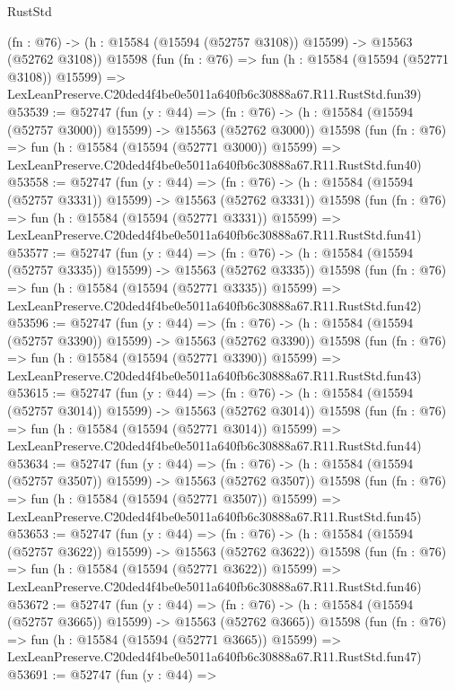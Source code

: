 \begin{lexlean}{RustStd}
\begin{coremodule}
    (fn : @76) -> (h : @15584 (@15594 (@52757 @3108)) @15599) -> @15563 (@52762 @3108))
    @15598
    (fun (fn : @76) =>
    fun (h : @15584 (@15594 (@52771 @3108)) @15599) =>
    LexLeanPreserve.C20ded4f4be0e5011a640fb6c30888a67.R11.RustStd.fun39)
@53539 := @52747
    (fun (y : @44) =>
    (fn : @76) -> (h : @15584 (@15594 (@52757 @3000)) @15599) -> @15563 (@52762 @3000))
    @15598
    (fun (fn : @76) =>
    fun (h : @15584 (@15594 (@52771 @3000)) @15599) =>
    LexLeanPreserve.C20ded4f4be0e5011a640fb6c30888a67.R11.RustStd.fun40)
@53558 := @52747
    (fun (y : @44) =>
    (fn : @76) -> (h : @15584 (@15594 (@52757 @3331)) @15599) -> @15563 (@52762 @3331))
    @15598
    (fun (fn : @76) =>
    fun (h : @15584 (@15594 (@52771 @3331)) @15599) =>
    LexLeanPreserve.C20ded4f4be0e5011a640fb6c30888a67.R11.RustStd.fun41)
@53577 := @52747
    (fun (y : @44) =>
    (fn : @76) -> (h : @15584 (@15594 (@52757 @3335)) @15599) -> @15563 (@52762 @3335))
    @15598
    (fun (fn : @76) =>
    fun (h : @15584 (@15594 (@52771 @3335)) @15599) =>
    LexLeanPreserve.C20ded4f4be0e5011a640fb6c30888a67.R11.RustStd.fun42)
@53596 := @52747
    (fun (y : @44) =>
    (fn : @76) -> (h : @15584 (@15594 (@52757 @3390)) @15599) -> @15563 (@52762 @3390))
    @15598
    (fun (fn : @76) =>
    fun (h : @15584 (@15594 (@52771 @3390)) @15599) =>
    LexLeanPreserve.C20ded4f4be0e5011a640fb6c30888a67.R11.RustStd.fun43)
@53615 := @52747
    (fun (y : @44) =>
    (fn : @76) -> (h : @15584 (@15594 (@52757 @3014)) @15599) -> @15563 (@52762 @3014))
    @15598
    (fun (fn : @76) =>
    fun (h : @15584 (@15594 (@52771 @3014)) @15599) =>
    LexLeanPreserve.C20ded4f4be0e5011a640fb6c30888a67.R11.RustStd.fun44)
@53634 := @52747
    (fun (y : @44) =>
    (fn : @76) -> (h : @15584 (@15594 (@52757 @3507)) @15599) -> @15563 (@52762 @3507))
    @15598
    (fun (fn : @76) =>
    fun (h : @15584 (@15594 (@52771 @3507)) @15599) =>
    LexLeanPreserve.C20ded4f4be0e5011a640fb6c30888a67.R11.RustStd.fun45)
@53653 := @52747
    (fun (y : @44) =>
    (fn : @76) -> (h : @15584 (@15594 (@52757 @3622)) @15599) -> @15563 (@52762 @3622))
    @15598
    (fun (fn : @76) =>
    fun (h : @15584 (@15594 (@52771 @3622)) @15599) =>
    LexLeanPreserve.C20ded4f4be0e5011a640fb6c30888a67.R11.RustStd.fun46)
@53672 := @52747
    (fun (y : @44) =>
    (fn : @76) -> (h : @15584 (@15594 (@52757 @3665)) @15599) -> @15563 (@52762 @3665))
    @15598
    (fun (fn : @76) =>
    fun (h : @15584 (@15594 (@52771 @3665)) @15599) =>
    LexLeanPreserve.C20ded4f4be0e5011a640fb6c30888a67.R11.RustStd.fun47)
@53691 := @52747
    (fun (y : @44) =>

\end{coremodule}
\end{lexlean}

